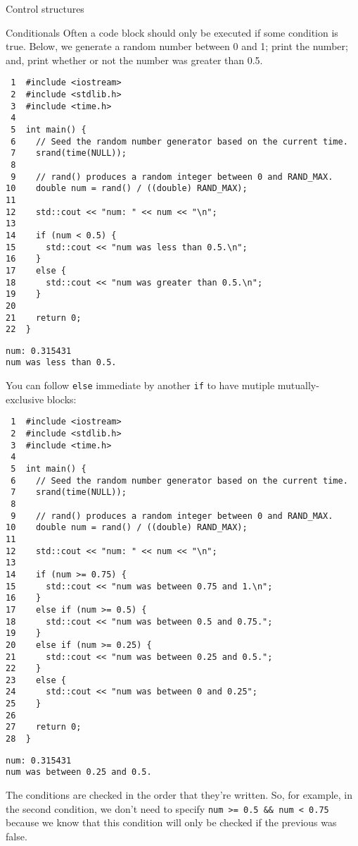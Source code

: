 \documentclass[presentation]{beamer}
\begin{document}
\begin{frame}[fragile,label={sec:orgheadline4}]{Control structures}
 \begin{block}{Conditionals}
Often a code block should only be executed if some condition is true. 
Below, we generate a random number between 0 and 1; print the number; and,
print whether or not the number was greater than 0.5.

\begin{verbatim}
 1  #include <iostream>
 2  #include <stdlib.h>
 3  #include <time.h>
 4  
 5  int main() {
 6    // Seed the random number generator based on the current time.
 7    srand(time(NULL));
 8  
 9    // rand() produces a random integer between 0 and RAND_MAX.
10    double num = rand() / ((double) RAND_MAX);
11  
12    std::cout << "num: " << num << "\n";
13  
14    if (num < 0.5) {
15      std::cout << "num was less than 0.5.\n";
16    }
17    else {
18      std::cout << "num was greater than 0.5.\n";
19    }
20  
21    return 0;
22  }
\end{verbatim}

\begin{verbatim}
num: 0.315431
num was less than 0.5.
\end{verbatim}

You can follow \texttt{else} immediate by another \texttt{if} to have mutiple mutually-
exclusive blocks:

\begin{verbatim}
 1  #include <iostream>
 2  #include <stdlib.h>
 3  #include <time.h>
 4  
 5  int main() {
 6    // Seed the random number generator based on the current time.
 7    srand(time(NULL));
 8  
 9    // rand() produces a random integer between 0 and RAND_MAX.
10    double num = rand() / ((double) RAND_MAX);
11  
12    std::cout << "num: " << num << "\n";
13  
14    if (num >= 0.75) {
15      std::cout << "num was between 0.75 and 1.\n";
16    }
17    else if (num >= 0.5) {
18      std::cout << "num was between 0.5 and 0.75.";
19    }
20    else if (num >= 0.25) {
21      std::cout << "num was between 0.25 and 0.5.";
22    }
23    else {
24      std::cout << "num was between 0 and 0.25";
25    }
26  
27    return 0;
28  }
\end{verbatim}

\begin{verbatim}
num: 0.315431
num was between 0.25 and 0.5.
\end{verbatim}

The conditions are checked in the order that they're written. So, for example,
in the second condition, we don't need to specify \texttt{num >= 0.5 \&\& num < 0.75} 
because we know that this condition will only be checked if the previous 
was false.
\end{block}


\end{frame}
\end{document}
